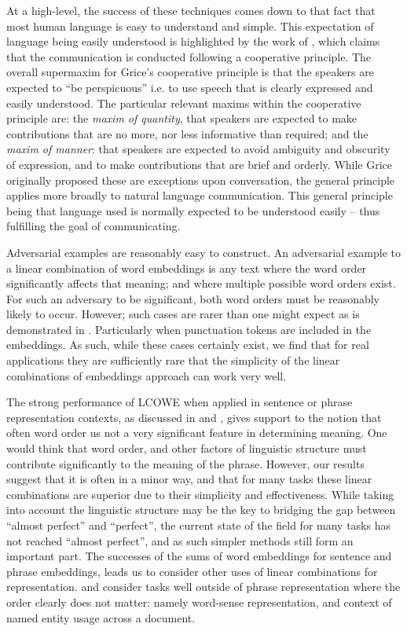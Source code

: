 \documentclass{book}
\begin{document}
At a high-level, the success of these techniques comes down to that fact that most human language is easy to understand and simple.
This expectation of language being easily understood is highlighted by the work of \citet{grice1975logic}, which claims that the communication is conducted following a cooperative principle.
The overall supermaxim for Grice's cooperative principle is that the speakers are expected to ``be perspicuous'' i.e. to use speech that is clearly expressed and easily understood.
The particular relevant maxims within the cooperative principle are:
the \emph{maxim of quantity}, that speakers are expected to make contributions that are no more, nor less informative than required;
and the \emph{maxim of manner}: that speakers are expected to avoid ambiguity and obscurity of expression, and to make contributions that are brief and orderly.
While Grice originally proposed these are exceptions upon conversation, the general principle applies more broadly to natural language communication.
This general principle being that language used is normally expected to be understood easily -- thus fulfilling the goal of communicating.


Adversarial examples are reasonably easy to construct.
An adversarial example to a linear combination of word embeddings is any text where the word order significantly affects that meaning;
and where multiple possible word orders exist.
For such an adversary to be significant, both word orders must be reasonably likely to occur.
However; such cases are rarer than one might expect  as is demonstrated in .
Particularly when punctuation tokens are included in the embeddings.
As such, while these cases certainly exist, we find that for real applications
they are sufficiently rare that the simplicity of the linear combinations of embeddings approach can work very well.


The strong performance of LCOWE when applied in sentence or phrase representation contexts,
as discussed in  and ,
gives support to the notion that often word order us not a very significant feature in determining meaning.
One would think that word order, and other factors of linguistic structure must contribute significantly to the meaning of the phrase.
However, our results suggest that it is often in a minor way, and that for many tasks these linear combinations are superior due to their simplicity and effectiveness.
While taking into account the linguistic structure may be the key to bridging the gap between ``almost perfect'' and ``perfect'', the current state of the field for many tasks has not reached ``almost perfect'', and as such simpler methods still form an important part.
The successes of the sums of word embeddings for sentence and phrase embeddings, leads us to consider other uses of linear combinations for representation.
 and  consider tasks well outside of phrase representation where the order clearly does not matter: namely word-sense representation, and context of named entity usage across a document.
\end{document}
